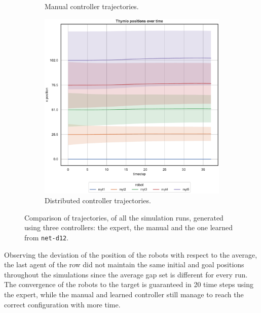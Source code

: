 \begin{figure}[!htb]
\begin{center}
\begin{subfigure}[h]{0.49\textwidth}
			\caption{Manual controller trajectories.}
		\end{subfigure}
		\hfill
		\begin{subfigure}[h]{0.49\textwidth}
			\centering
			\includegraphics[width=\textwidth]{contents/images/net-d12/position-overtime-learned_distributed}
			\caption{Distributed controller trajectories.}
		\end{subfigure}
	\end{center}
	\vspace{-0.5cm}
	\caption[Evaluation of the trajectories learned by 
	\texttt{net-d12}.]{Comparison of trajectories, of all the simulation runs, 
	generated using three controllers: the expert, the manual and the one learned 
	from \texttt{net-d12}.}
	\label{fig:net-d12traj}
\end{figure}

\noindent
Observing the deviation of the position of the robots with respect to the average, 
the last agent of the row did not maintain the same initial and goal positions 
throughout the simulations since the average gap set is different for every run.
The convergence of the robots to the target is guaranteed in 20 time steps using 
the expert, while the manual and learned controller still manage to reach the 
correct configuration with more time.

